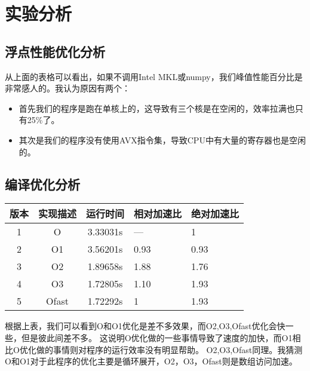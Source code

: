 \documentclass{SYSUReport}
\begin{document}
\section{实验分析}
\subsection{浮点性能优化分析}
从上面的表格可以看出，如果不调用Intel MKL或numpy，我们峰值性能百分比是非常感人的。我认为原因有两个：
\begin{itemize}
    \item 首先我们的程序是跑在单核上的，这导致有三个核是在空闲的，效率拉满也只有25\%了。
    \item 其次是我们的程序没有使用AVX指令集，导致CPU中有大量的寄存器也是空闲的。
\end{itemize}
\subsection{编译优化分析}

    \begin{table}[h]
        \centering
        \begin{tabular}{|c|c|c|p{1.5cm}|p{1.5cm}|}
            \hline
            版本 & 实现描述 & 运行时间& 相对加速比 & 绝对加速比\\
            \hline
            1 & O &3.33031s&—&1\\ 
            \hline
            2 & O1 &3.56201s&0.93&0.93 \\ 
            \hline
            3 & O2 &1.89658s&1.88&1.76 \\ 
            \hline
            4 & O3&1.72805s&1.10&1.93\\ 
            \hline
            5 & Ofast&1.72292s&1&1.93\\
            \hline
            
        \end{tabular}
    \end{table}
根据上表，我们可以看到O和O1优化是差不多效果，而O2,O3,Ofast优化会快一些，但是彼此间差不多。
这说明O优化做的一些事情导致了速度的加快，而O1相比O优化做的事情则对程序的运行效率没有明显帮助。
O2,O3,Ofast同理。我猜测O和O1对于此程序的优化主要是循环展开，O2，O3，Ofast则是数组访问加速。
\end{document}
